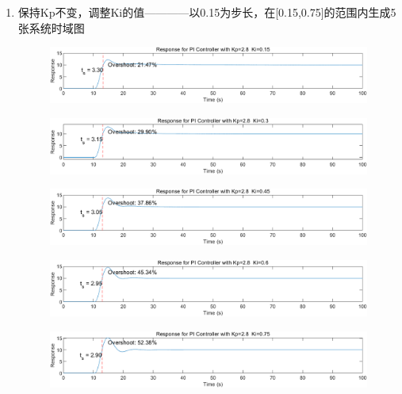 \documentclass{thuemp}
\begin{document}
\begin{enumerate}
  \item 保持Kp不变，调整Ki的值————以0.15为步长，在[0.15,0.75]的范围内生成5张系统时域图
  \begin{figure}[H]
    \centering
    \includegraphics[width=1\linewidth]{./img/PI/p1.png}
  \end{figure}
  \begin{figure}[H]
    \centering
    \includegraphics[width=1\linewidth]{./img/PI/p2.png}
  \end{figure}
  \begin{figure}[H]
    \centering
    \includegraphics[width=1\linewidth]{./img/PI/p3.png}
  \end{figure}
  \begin{figure}[H]
    \centering
    \includegraphics[width=1\linewidth]{./img/PI/p4.png}
  \end{figure}
  \begin{figure}[H]
    \centering
    \includegraphics[width=1\linewidth]{./img/PI/p5.png}
  \end{figure}

\end{enumerate}
\end{document}

